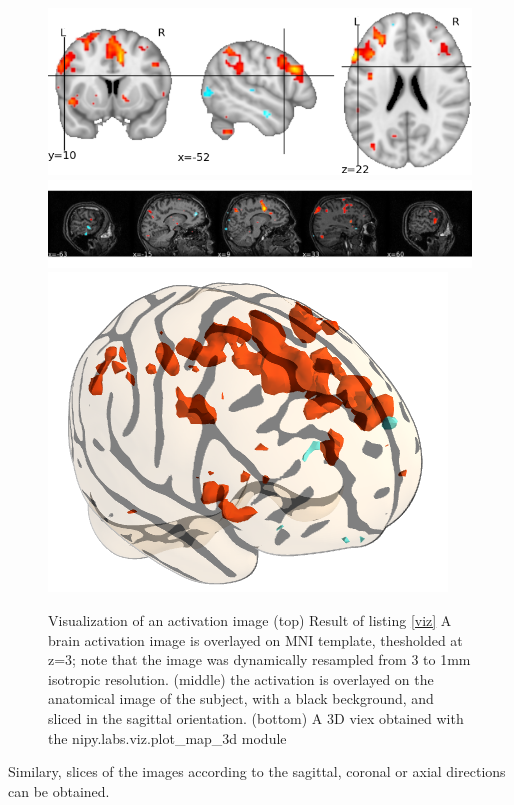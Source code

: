 \documentclass{bioinfo}
\begin{document}
\noindent
\hspace*{-.5cm}

\begin{figure}
\begin{center}
\includegraphics[width=\linewidth]{Figures/ortho_view.png}
\includegraphics[width=\linewidth]{Figures/x_view.png}
\includegraphics[width=.6\linewidth]{Figures/viz_3d.png}
\end{center}
\caption{Visualization of an activation image (top) Result of listing \ref{viz} A brain activation image is
  overlayed on MNI template, thesholded at z=3; note that the image
  was dynamically resampled from 3 to 1mm isotropic resolution.
(middle) the activation is overlayed on the anatomical image of the subject, with a black beckground, and sliced in the sagittal orientation.
(bottom) A 3D viex obtained with the nipy.labs.viz.plot\_map\_3d module}
\label{fig:viz}
\end{figure}

Similary, slices of the images according to the sagittal, coronal or
axial directions can be obtained.
\end{document}
